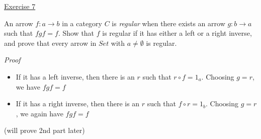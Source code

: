 \noindent
\underline{Exercise 7}
\vspace{2mm}

An arrow $f: a \to b$ in a category $C$ is \emph{regular} when there exists an arrow $g: b \to a$
such that $f g f = f$. Show that $f$ is regular if it has either a left or a right inverse,
and prove that every arrow in $Set$ with $a \neq \emptyset$ is regular.

\vspace{2mm}

\noindent
\emph{Proof}

\begin{itemize}
	\item If it has a left inverse, then there is an $r$ such that $r \circ f = 1_a$. Choosing $g = r$, we have $f g f = f$
	\item If it has a right inverse, then there is an $r$ such that $f \circ r = 1_b$. Choosing $g = r$, we again have $f g f = f$
\end{itemize}

(will prove 2nd part later)

\vspace{2mm}
